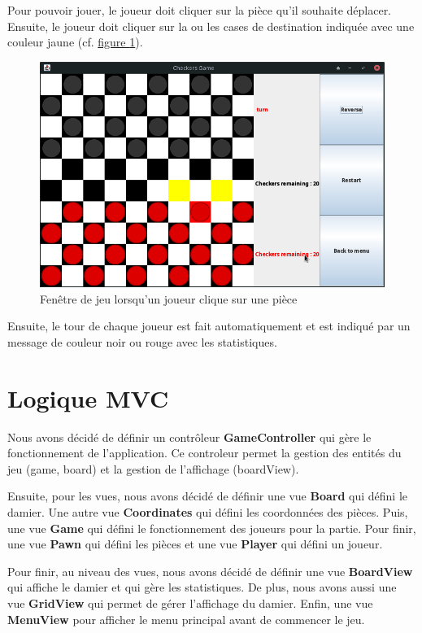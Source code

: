 Pour pouvoir jouer, le joueur doit cliquer sur la pièce qu'il souhaite déplacer. Ensuite,
le joueur doit cliquer sur la ou les cases de destination indiquée avec une couleur jaune
(cf. \hyperref[f:fenetreClick]{figure \ref{f:fenetreClick}}).

\begin{figure}[H]
    \centering
    \includegraphics[width=1\columnwidth]{figures/boardGameClick.png}
    \caption[Fenêtre de jeu lorsqu'un joueur clique sur une pièce]{Fenêtre de jeu lorsqu'un joueur clique sur une pièce}
    \label{f:fenetreClick}
\end{figure}

Ensuite, le tour de chaque joueur est fait automatiquement et est indiqué par un message de couleur noir ou rouge 
avec les statistiques.

\section{Logique MVC}

Nous avons décidé de définir un contrôleur \textbf{GameController} qui gère le fonctionnement de l'application.
Ce controleur permet la gestion des entités du jeu (game, board)  et la gestion de l'affichage (boardView). \medskip

Ensuite, pour les vues, nous avons décidé de définir une vue \textbf{Board} qui défini le damier. 
Une autre vue \textbf{Coordinates} qui défini les coordonnées des pièces. 
Puis, une vue \textbf{Game} qui défini le fonctionnement des joueurs pour la partie. 
Pour finir, une vue \textbf{Pawn} qui défini les pièces et une vue \textbf{Player} qui 
défini un joueur. \medskip

Pour finir, au niveau des vues, nous avons décidé de définir une vue \textbf{BoardView} qui affiche le damier 
et qui gère les statistiques. De plus, nous avons aussi une vue \textbf{GridView} 
qui permet de gérer l'affichage du damier. Enfin, une vue \textbf{MenuView} pour afficher 
le menu principal avant de commencer le jeu.

